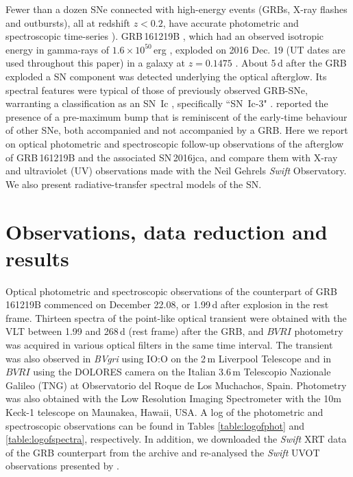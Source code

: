 \documentclass[fleqn,usenatbib]{mnras}
\begin{document}
Fewer than a dozen SNe connected with high-energy events (GRBs, X-ray flashes and outbursts), all at redshift $z < 0.2$, have accurate photometric and spectroscopic time-series \citep{Galama98,Hjorth03,Stanek03,Matheson03,Ferrero06,Mazzali08a,Tanaka09,Bufano2012,Izzo19,Delia15,Toy16}). 
GRB\,161219B \citep{GCN20296}, which had an observed isotropic energy in gamma-rays of $1.6 \times 10^{50}$\,erg \citep{Frederiks17}, 
exploded on 2016 Dec. 19 (UT dates are used throughout this paper)
in a galaxy at $z=0.1475$ \citep{Tanvir16,Cano17}. 
About 5\,d after the GRB exploded a SN component was detected underlying the
optical afterglow.   Its spectral features were typical of those of
previously observed GRB-SNe, warranting a classification as an SN~Ic \citep{Pian17TNS},
specifically ``SN~Ic-3" \citep{Prentice17}.   \citet{Cano17} reported the presence of a pre-maximum bump that is reminiscent of the early-time behaviour of other SNe, both accompanied and not accompanied by a GRB.  Here we report  on optical photometric and 
spectroscopic follow-up observations of the afterglow of GRB\,161219B and the associated SN\,2016jca, and compare  them with X-ray and ultraviolet (UV) observations made with the Neil Gehrels {\it Swift}  Observatory.  
We also present radiative-transfer spectral models of the SN. 

\section{Observations, data reduction and results}

Optical photometric and spectroscopic observations of the counterpart of  GRB\,161219B commenced on December 22.08, or 1.99\,d  after explosion in the rest frame.   Thirteen spectra of the point-like optical transient were obtained with the
VLT between 1.99 and 268\,d (rest frame) after the GRB, and $BVRI$ photometry was
acquired in various optical filters in the same time interval.   The transient was also observed in {\it BVgri} using IO:O on the 2\,m Liverpool Telescope \citep[LT;][]{Steele04} and in $BVRI$ using the DOLORES camera on the Italian 3.6\,m Telescopio Nazionale Galileo (TNG) at Observatorio del Roque de Los Muchachos, Spain. Photometry was also obtained with the Low Resolution Imaging Spectrometer \citep[LRIS;][]{Oke95} with the 
10m Keck-1 telescope on Maunakea, Hawaii, USA. A log of the photometric and spectroscopic observations can be found in Tables \ref{table:logofphot} and \ref{table:logofspectra}, respectively.   In addition, we downloaded the {\it Swift} XRT data of the GRB counterpart from the archive and re-analysed the {\it Swift} UVOT observations presented by \citet{Cano17}.
\end{document}
